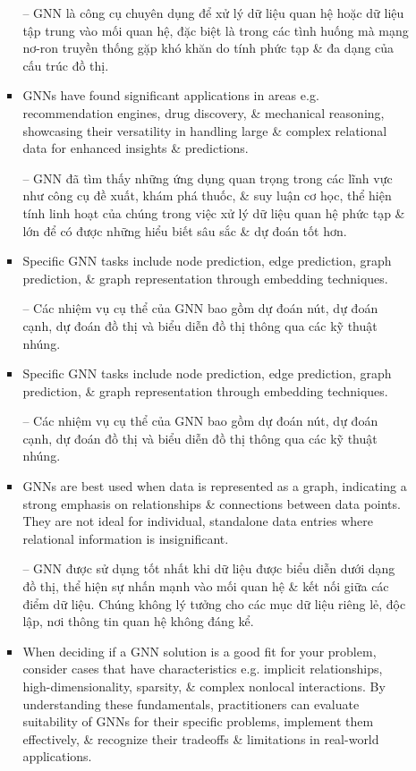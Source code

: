 \documentclass{article}
\begin{document}
\begin{itemize}
\begin{itemize}
\begin{itemize}
            -- GNN là công cụ chuyên dụng để xử lý dữ liệu quan hệ hoặc dữ liệu tập trung vào mối quan hệ, đặc biệt là trong các tình huống mà mạng nơ-ron truyền thống gặp khó khăn do tính phức tạp \& đa dạng của cấu trúc đồ thị.
            \item GNNs have found significant applications in areas e.g. recommendation engines, drug discovery, \& mechanical reasoning, showcasing their versatility in handling large \& complex relational data for enhanced insights \& predictions.

            -- GNN đã tìm thấy những ứng dụng quan trọng trong các lĩnh vực như công cụ đề xuất, khám phá thuốc, \& suy luận cơ học, thể hiện tính linh hoạt của chúng trong việc xử lý dữ liệu quan hệ phức tạp \& lớn để có được những hiểu biết sâu sắc \& dự đoán tốt hơn.
            \item Specific GNN tasks include node prediction, edge prediction, graph prediction, \& graph representation through embedding techniques.

            -- Các nhiệm vụ cụ thể của GNN bao gồm dự đoán nút, dự đoán cạnh, dự đoán đồ thị và biểu diễn đồ thị thông qua các kỹ thuật nhúng.
            \item Specific GNN tasks include node prediction, edge prediction, graph prediction, \& graph representation through embedding techniques.

            -- Các nhiệm vụ cụ thể của GNN bao gồm dự đoán nút, dự đoán cạnh, dự đoán đồ thị và biểu diễn đồ thị thông qua các kỹ thuật nhúng.
            \item GNNs are best used when data is represented as a graph, indicating a strong emphasis on relationships \& connections between data points. They are not ideal for individual, standalone data entries where relational information is insignificant.

            -- GNN được sử dụng tốt nhất khi dữ liệu được biểu diễn dưới dạng đồ thị, thể hiện sự nhấn mạnh vào mối quan hệ \& kết nối giữa các điểm dữ liệu. Chúng không lý tưởng cho các mục dữ liệu riêng lẻ, độc lập, nơi thông tin quan hệ không đáng kể.
            \item When deciding if a GNN solution is a good fit for your problem, consider cases that have characteristics e.g. implicit relationships, high-dimensionality, sparsity, \& complex nonlocal interactions. By understanding these fundamentals, practitioners can evaluate suitability of GNNs for their specific problems, implement them effectively, \& recognize their tradeoffs \& limitations in real-world applications.


\end{itemize}
\end{itemize}
\end{itemize}
\end{document}
